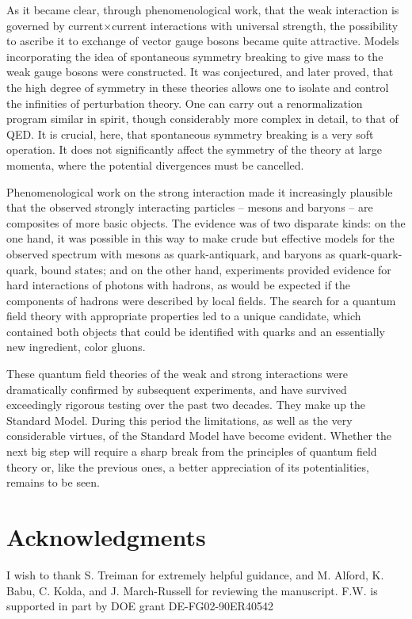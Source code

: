 \documentclass[12pt]{article}
\begin{document}
As it became clear, through phenomenological work, that the weak
interaction is governed by current$\times$current interactions with
universal strength, the possibility to ascribe it to exchange of
vector gauge bosons became quite attractive.  Models incorporating the
idea of spontaneous symmetry breaking to give mass to the weak gauge
bosons were constructed.  It was conjectured, and later proved, that
the high degree of symmetry in these theories allows one to isolate
and control the infinities of perturbation theory.  One can carry out
a renormalization program similar in spirit, though considerably more
complex in detail, to that of QED.  It is crucial, here, that
spontaneous symmetry breaking is a very soft operation.  It does not
significantly affect the symmetry of the theory at large momenta,
where the potential divergences must be cancelled.  

Phenomenological work on the strong interaction made it increasingly
plausible that the observed strongly interacting particles -- mesons
and baryons -- are composites of more basic objects.  The evidence was
of two disparate kinds: on the one hand, it was possible in this way
to make crude but effective models for the observed spectrum with
mesons as quark-antiquark, and baryons as quark-quark-quark, bound
states; and on the other hand, experiments provided evidence for hard
interactions of photons with hadrons, as would be expected if the
components of hadrons were described by local fields.  The search for
a quantum field theory with appropriate properties led to a unique
candidate, which contained both objects that could be identified with
quarks and an essentially new ingredient, color gluons.

These quantum field theories of the
weak and strong interactions were dramatically confirmed by subsequent
experiments, and have survived exceedingly rigorous testing over the
past two decades.  They make up the Standard Model.  During this
period the limitations, as well as the very considerable virtues, of
the Standard Model have become evident.  Whether the next big step
will require a sharp break from the principles of quantum field theory
or, like the previous ones, a better appreciation of its
potentialities, remains to be seen.


\section*{Acknowledgments}
I wish to thank S. Treiman for extremely helpful guidance, and
M. Alford, K. Babu, C. Kolda, and J. March-Russell for reviewing the
manuscript.  F.W. is supported in part by DOE grant DE-FG02-90ER40542
\end{document}
